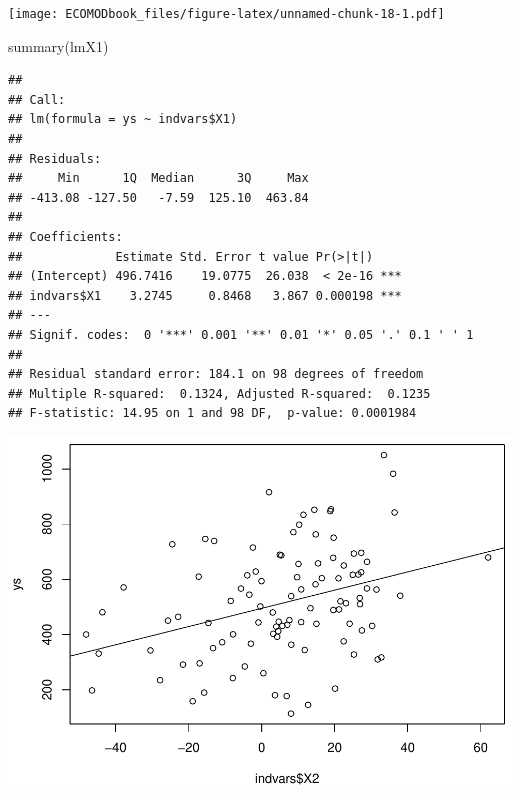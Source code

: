 \documentclass[
]{book}
\newenvironment{Shaded}{\begin{snugshade}}{\end{snugshade}}
\newcommand{\FunctionTok}[1]{\textcolor[rgb]{0.00,0.00,0.00}{#1}}
\newcommand{\NormalTok}[1]{#1}
\newcommand{\OtherTok}[1]{\textcolor[rgb]{0.56,0.35,0.01}{#1}}
\newcommand{\SpecialCharTok}[1]{\textcolor[rgb]{0.00,0.00,0.00}{#1}}
\begin{document}
\texttt{[image: ECOMODbook\_files/figure-latex/unnamed-chunk-18-1.pdf]}

\begin{Shaded}
\begin{Highlighting}[]
\FunctionTok{summary}\NormalTok{(lmX1)}
\end{Highlighting}
\end{Shaded}

\begin{verbatim}
## 
## Call:
## lm(formula = ys ~ indvars$X1)
## 
## Residuals:
##     Min      1Q  Median      3Q     Max 
## -413.08 -127.50   -7.59  125.10  463.84 
## 
## Coefficients:
##             Estimate Std. Error t value Pr(>|t|)    
## (Intercept) 496.7416    19.0775  26.038  < 2e-16 ***
## indvars$X1    3.2745     0.8468   3.867 0.000198 ***
## ---
## Signif. codes:  0 '***' 0.001 '**' 0.01 '*' 0.05 '.' 0.1 ' ' 1
## 
## Residual standard error: 184.1 on 98 degrees of freedom
## Multiple R-squared:  0.1324, Adjusted R-squared:  0.1235 
## F-statistic: 14.95 on 1 and 98 DF,  p-value: 0.0001984
\end{verbatim}

\begin{Shaded}
\end{Shaded}

\includegraphics{ECOMODbook_files/figure-latex/unnamed-chunk-18-2.pdf}
\end{document}
